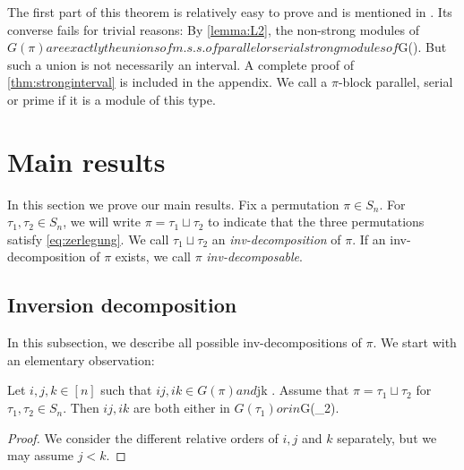 \documentclass{amsart}
\makeatletter
\theoremstyle{plain}
{
	\newtheorem{{lemma}}{{Lemma}}[section]
	\labelformat{{lemma}}{{Lemma}##}
}
{
	\newtheorem{{theorem}}{{Theorem}}[section]
	\labelformat{{theorem}}{{Theorem}##}
}
{	\@namedef{c@{theorem}}{\@nameuse{c@{lemma}}}}
{
	\newtheorem{{corollary}}{{Corollary}}[section]
	\labelformat{{corollary}}{{Corollary}##}
}
{	\@namedef{c@{corollary}}{\@nameuse{c@{lemma}}}}
{
	\newtheorem{{proposition}}{{Proposition}}[section]
	\labelformat{{proposition}}{{Proposition}##}
}
{	\@namedef{c@{proposition}}{\@nameuse{c@{lemma}}}}
{
	\newtheorem{{algorithm}}{{Construction}}[section]
	\labelformat{{algorithm}}{{Construction}##}
}
{	\@namedef{c@{algorithm}}{\@nameuse{c@{lemma}}}}
\theoremstyle{definition}
{
	\newtheorem{{definition}}{{Definition}}[section]
	\labelformat{{definition}}{{Definition}##}
}
{	\@namedef{c@{definition}}{\@nameuse{c@{lemma}}}}
{
	\newtheorem{{problem}}{{Problem}}[section]
	\labelformat{{problem}}{{Problem}##}
}
{	\@namedef{c@{problem}}{\@nameuse{c@{lemma}}}}
\makeatother
\begin{document}
The first part of this theorem is relatively easy to prove and is mentioned in \cite{young}. 
Its converse fails for trivial reasons: By \ref{lemma:L2}, the non-strong modules of ${G(\pi)} are exactly the unions of m.s.s. of parallel or serial strong modules of ${G(\pi)}. But such a union is not necessarily an interval.
A complete proof of \ref{thm:stronginterval} is included in the appendix.
We call a $\pi$-block parallel, serial or prime if it is a module of this type.

\section{Main results}\label{sec:main}
In this section we prove our main results. Fix a permutation $\pi \in {S_n}$.
For $\tau_1,\tau_2 \in {S_n}$, we will write $\pi = \tau_1 \operatorname{\sqcup} \tau_2$ to indicate that the three permutations satisfy \eqref{eq:zerlegung}.
We call $\tau_1 \operatorname{\sqcup} \tau_2$ an \emph{inv-decomposition} of $\pi$.
If an inv-decomposition of $\pi$ exists, we call $\pi$ \emph{inv-decomposable}.

\subsection{Inversion decomposition}
In this subsection, we describe all possible inv-decompositions of $\pi$.
We start with an elementary observation:
\begin{lemma} \label{lemma:dreieck}
Let $i,j,k \in [n]$ such that $ij, ik \in {G(\pi)} and $jk .
Assume that $\pi = \tau_1 \operatorname{\sqcup} \tau_2$ for $\tau_1,\tau_2 \in {S_n}$.
Then $ij, ik$ are both either in ${G(\tau_1)} or in ${G(\tau_2)}.
\end{lemma}
\begin{proof}
We consider the different relative orders of $i,j$ and $k$ separately, but we may assume $j < k$.
\end{proof}
\end{document}
